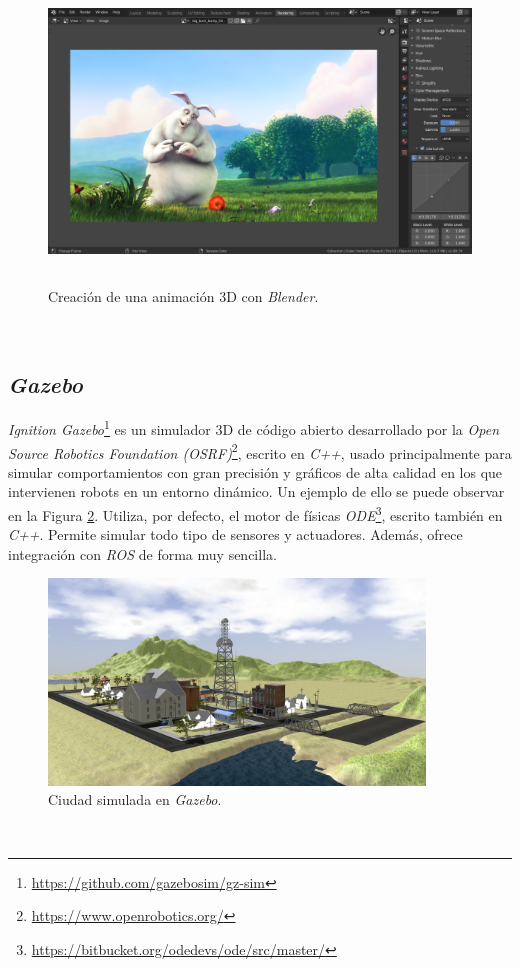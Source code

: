 \begin{figure} [h!]
	\begin{center}
		\includegraphics[width=12cm, height=8cm]{figs/blender}
	\end{center}
	\caption{Creación de una animación 3D con \textit{Blender}.}
	\label{fig:blender}
\end{figure}\

\subsection{\textit{Gazebo}}
\label{subsection:gazebo}
\textit{Ignition Gazebo}\footnote{\url{https://github.com/gazebosim/gz-sim}} es un simulador 3D de código abierto desarrollado por la \textit{Open Source Robotics Foundation (OSRF)}\footnote{\url{https://www.openrobotics.org/}}, escrito en \textit{C++}, usado principalmente para simular comportamientos con gran precisión y gráficos de alta calidad en los que intervienen robots en un entorno dinámico. Un ejemplo de ello se puede observar en la Figura \ref{fig:city}. Utiliza, por defecto, el motor de físicas \textit{ODE}\footnote{\url{https://bitbucket.org/odedevs/ode/src/master/}}, escrito también en \textit{C++}. Permite simular todo tipo de sensores y actuadores. Además, ofrece integración con \textit{ROS} de forma muy sencilla.\\

\begin{figure} [h!]
	\begin{center}
		\includegraphics[width=10cm]{figs/city}
	\end{center}
	\caption{Ciudad simulada en \textit{Gazebo}.}
	\label{fig:city}
\end{figure}\

